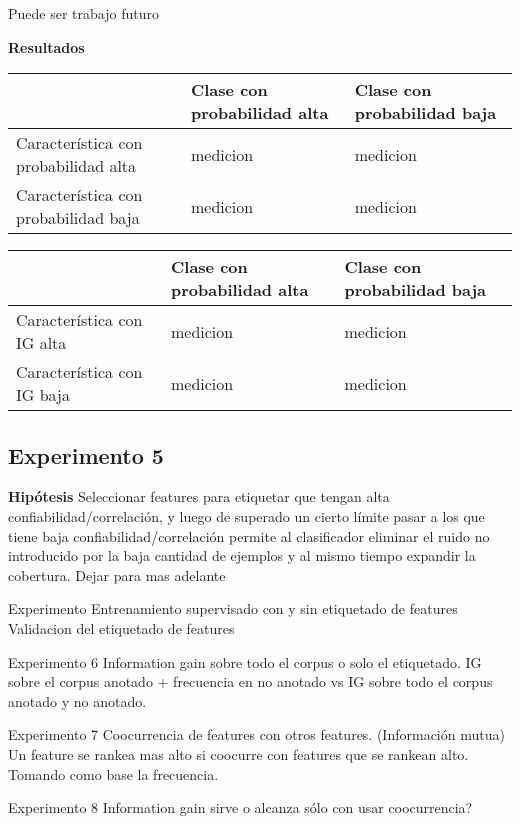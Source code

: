 Puede ser trabajo futuro



\textbf{Resultados}\\

\begin{tabular}{||p{4cm} | l | l||}
\hline
 & Clase con probabilidad alta & Clase con probabilidad baja \\
\hline
Característica con probabilidad alta & medicion & medicion \\
\hline
Característica con probabilidad baja & medicion & medicion \\
\hline
\end{tabular}
\hfill
\begin{tabular}{||p{4cm} | l | l||}
\hline
 & Clase con probabilidad alta & Clase con probabilidad baja \\
\hline
Característica con IG alta & medicion & medicion \\
\hline
Característica con IG baja & medicion & medicion \\
\hline

\end{tabular}



\subsection{Experimento 5}
\textbf{Hipótesis} Seleccionar features para etiquetar que tengan alta confiabilidad/correlación, y luego de superado un cierto límite pasar a los que tiene baja confiabilidad/correlación permite al clasificador eliminar el ruido no introducido por la baja cantidad de ejemplos y al mismo tiempo expandir la cobertura.
Dejar para mas adelante


Experimento Entrenamiento supervisado con y sin etiquetado de  features
Validacion del etiquetado de features



Experimento 6
Information gain sobre todo el corpus o solo el etiquetado.
IG sobre el corpus anotado + frecuencia en no anotado vs IG sobre todo el corpus anotado y no anotado.


Experimento 7
Coocurrencia de features con otros features. (Información mutua)
Un feature se rankea mas alto si coocurre con features que se rankean alto. Tomando como base la frecuencia.

Experimento 8
Information gain sirve o alcanza sólo con usar coocurrencia?
